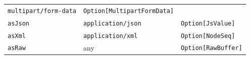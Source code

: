 \documentclass[oneside,11pt,a4paper,]{book}
\begin{document}
\begin{longtable}[c]{@{}lll@{}}
\begin{minipage}[t]{0.29\columnwidth}\raggedright\strut
\texttt{multipart/form-data}
\strut\end{minipage} &
\begin{minipage}[t]{0.33\columnwidth}\raggedright\strut
\texttt{Option{[}MultipartFormData{]}}
\strut\end{minipage}\tabularnewline
\begin{minipage}[t]{0.29\columnwidth}\raggedright\strut
\texttt{asJson}
\strut\end{minipage} &
\begin{minipage}[t]{0.29\columnwidth}\raggedright\strut
\texttt{application/json}
\strut\end{minipage} &
\begin{minipage}[t]{0.33\columnwidth}\raggedright\strut
\texttt{Option{[}JsValue{]}}
\strut\end{minipage}\tabularnewline
\begin{minipage}[t]{0.29\columnwidth}\raggedright\strut
\texttt{asXml}
\strut\end{minipage} &
\begin{minipage}[t]{0.29\columnwidth}\raggedright\strut
\texttt{application/xml}
\strut\end{minipage} &
\begin{minipage}[t]{0.33\columnwidth}\raggedright\strut
\texttt{Option{[}NodeSeq{]}}
\strut\end{minipage}\tabularnewline
\begin{minipage}[t]{0.29\columnwidth}\raggedright\strut
\texttt{asRaw}
\strut\end{minipage} &
\begin{minipage}[t]{0.29\columnwidth}\raggedright\strut
any
\strut\end{minipage} &
\begin{minipage}[t]{0.33\columnwidth}\raggedright\strut
\texttt{Option{[}RawBuffer{]}}
\strut\end{minipage}\tabularnewline
\bottomrule
\end{longtable}
\end{document}
